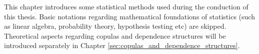 
This chapter introduces some statistical methods used during the conduction of this thesis. Basic notations regarding mathematical foundations of statistics (such as linear algebra, probability theory, hypothesis testing etc) are skipped. Theoretical aspects regarding copulas and dependence structures will be introduced separately in Chapter \ref{sec:copulas_and_dependence_structures}.

